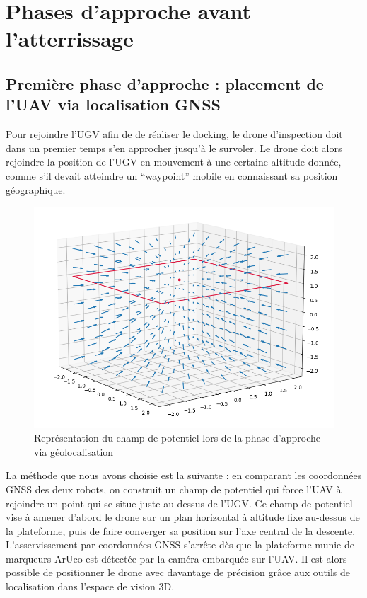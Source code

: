 \section{Phases d’approche avant l’atterrissage}

\subsection{Première phase d’approche : placement de l’UAV via localisation GNSS}

Pour rejoindre l’UGV afin de de réaliser le docking, le drone d’inspection doit dans un premier temps s’en approcher jusqu’à le survoler. Le drone doit alors rejoindre la position de l’UGV en mouvement à une certaine altitude donnée, comme s'il devait atteindre un “waypoint” mobile en connaissant sa position géographique.

\begin{figure}[H]
    \centering\includegraphics[width=150mm]{images/phases_approche/potent_phase_1.png}
    \caption{Représentation du champ de potentiel lors de la phase d'approche via géolocalisation}
\end{figure}

La méthode que nous avons choisie est la suivante : en comparant les coordonnées GNSS des deux robots, on construit un champ de potentiel qui force l’UAV à rejoindre un point qui se situe juste au-dessus de l’UGV. Ce champ de potentiel vise à amener d’abord le drone sur un plan horizontal à altitude fixe au-dessus de la plateforme, puis de faire converger sa position sur l’axe central de la descente.
L'asservissement par coordonnées GNSS s’arrête dès que la plateforme munie de marqueurs ArUco est détectée par la caméra embarquée sur l’UAV. Il est alors possible de positionner le drone avec davantage de précision grâce aux outils de localisation dans l’espace de vision 3D.

